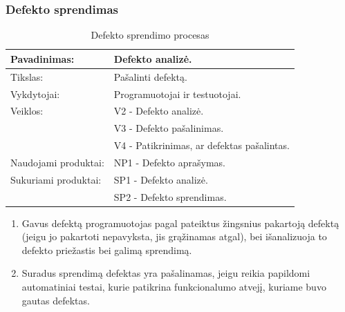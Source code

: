 \documentclass{VUMIFPSkursinis}
\begin{document}
	\subsubsection{Defekto sprendimas}
	\begin{center}
		\begin{table}[ht]
		\caption{Defekto sprendimo procesas}
		\begin{tabular}{ | l | l | } 
		\hline
		Pavadinimas:         & Defekto analizė.                               \\ \hline
		Tikslas: 	           & Pašalinti defektą.\\ \hline
		Vykdytojai:          & Programuotojai ir testuotojai.                                \\ \hline
		Veiklos:             & V2 - Defekto analizė. \\ 
									  & V3 - Defekto pašalinimas. 																			 \\ 
									  & V4 - Patikrinimas, ar defektas pašalintas. \\ \hline
		Naudojami produktai: & NP1 - Defekto aprašymas.																											 \\ \hline
		Sukuriami produktai: & SP1 - Defekto analizė.																											\\ 
												& SP2 - Defekto sprendimas. \\ \hline
		\end{tabular}
	\end{table}
		\end{center}
		\begin{enumerate}
			\item Gavus defektą programuotojas pagal pateiktus žingsnius pakartoją defektą (jeigu jo pakartoti nepavyksta, jis grąžinamas atgal), bei išanalizuoja to defekto priežastis bei galimą sprendimą.
			\item Suradus sprendimą defektas yra pašalinamas, jeigu reikia papildomi automatiniai testai, kurie patikrina funkcionalumo atvejį, kuriame buvo gautas defektas.
		\end{enumerate}
\end{document}
